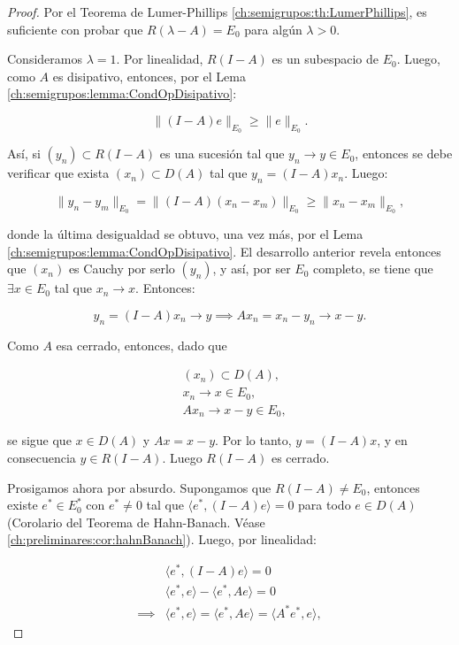 \begin{proof}
    Por el Teorema de Lumer-Phillips \ref{ch:semigrupos:th:LumerPhillips}, es suficiente con probar que $R(\lambda - A) = E_0$ para algún $\lambda >0$.

    Consideramos $\lambda = 1$. Por linealidad, $R(I - A)$ es un subespacio de $E_0$. Luego, como $A$ es disipativo, entonces, por el Lema \ref{ch:semigrupos:lemma:CondOpDisipativo}:

    \[\lVert (I-A)e \rVert_{E_0} \geq \lVert e \rVert_{E_0}.\]

    Así, si $(y_n) \subset R(I-A)$ es una sucesión tal que $y_n \rightarrow y \in E_0$, entonces se debe verificar que exista $(x_n) \subset D(A)$ tal que $y_n = (I - A)x_n$. Luego:

    \[\lVert y_n - y_m \rVert_{E_0} = \lVert (I-A) (x_n - x_m) \rVert_{E_0} \geq \lVert x_n - x_m\rVert_{E_0}, \]

    donde la última desigualdad se obtuvo, una vez más, por el Lema \ref{ch:semigrupos:lemma:CondOpDisipativo}. El desarrollo anterior revela entonces que $(x_n)$ es Cauchy por serlo $(y_n)$, y así, por ser $E_0$ completo, se tiene que $\exists x \in E_0$ tal que $x_n \rightarrow x$. Entonces:

    \[y_n = (I - A)x_n \rightarrow y \implies Ax_n = x_n - y_n \rightarrow x - y.\]

    Como $A$ esa cerrado, entonces, dado que

    \begin{align*}
        &(x_n) \subset D(A),\\
        &x_n \rightarrow x \in E_0,\\
        &Ax_n \rightarrow x-y \in E_0,
    \end{align*}

    se sigue que $x \in D(A)$ y $Ax = x - y$. Por lo tanto, $y = (I-A)x$, y en consecuencia $y \in R(I-A)$. Luego $R(I-A)$ es cerrado.

    Prosigamos ahora por absurdo. Supongamos que $R(I-A) \neq E_0$, entonces existe $e^* \in E_0^*$ con $e^* \neq 0$ tal que $\langle e^*, (I-A)e\rangle = 0$ para todo $e \in D(A)$ (Corolario del Teorema de Hahn-Banach. Véase \ref{ch:preliminares:cor:hahnBanach}). Luego, por linealidad:

    \begin{align*}
        &\langle e^*, (I-A)e\rangle = 0\\
        &\langle e^*, e \rangle - \langle e^*, Ae \rangle = 0\\
        \implies& \langle e^*, e \rangle = \langle e^*, Ae\rangle = \langle A^* e^*, e \rangle,
    \end{align*}


\end{proof}
